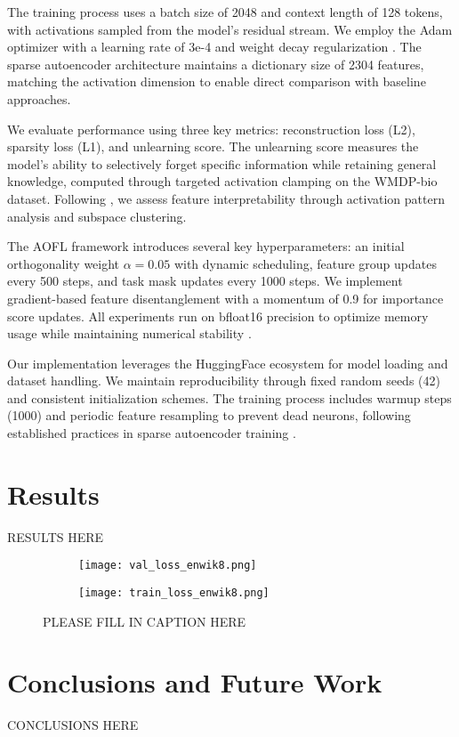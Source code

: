 \documentclass{article} %
\begin{document}
The training process uses a batch size of 2048 and context length of 128 tokens, with activations sampled from the model's residual stream. We employ the Adam optimizer \cite{kingma2014adam} with a learning rate of 3e-4 and weight decay regularization \cite{loshchilov2017adamw}. The sparse autoencoder architecture maintains a dictionary size of 2304 features, matching the activation dimension to enable direct comparison with baseline approaches.

We evaluate performance using three key metrics: reconstruction loss (L2), sparsity loss (L1), and unlearning score. The unlearning score measures the model's ability to selectively forget specific information while retaining general knowledge, computed through targeted activation clamping on the WMDP-bio dataset. Following \cite{goodfellow2016deep}, we assess feature interpretability through activation pattern analysis and subspace clustering.

The AOFL framework introduces several key hyperparameters: an initial orthogonality weight $\alpha=0.05$ with dynamic scheduling, feature group updates every 500 steps, and task mask updates every 1000 steps. We implement gradient-based feature disentanglement with a momentum of 0.9 for importance score updates. All experiments run on bfloat16 precision to optimize memory usage while maintaining numerical stability \cite{vaswani2017attention}.

Our implementation leverages the HuggingFace ecosystem for model loading and dataset handling. We maintain reproducibility through fixed random seeds (42) and consistent initialization schemes. The training process includes warmup steps (1000) and periodic feature resampling to prevent dead neurons, following established practices in sparse autoencoder training \cite{goodfellow2016deep}.

\section{Results}
\label{sec:results}
RESULTS HERE

\begin{figure}[h]
    \centering
    \begin{subfigure}{0.49\textwidth}
        \texttt{[image: val\_loss\_enwik8.png]}
        \label{fig:first-run}
    \end{subfigure}
    \hfill
    \begin{subfigure}{0.49\textwidth}
        \texttt{[image: train\_loss\_enwik8.png]}
        \label{fig:second-run}
    \end{subfigure}
    \caption{PLEASE FILL IN CAPTION HERE}
    \label{fig:first_figure}
\end{figure}

\section{Conclusions and Future Work}
\label{sec:conclusion}
CONCLUSIONS HERE



\end{document}
